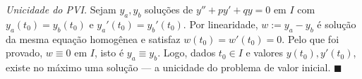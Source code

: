 \emph{Unicidade do PVI.} Sejam $y_a,y_b$ soluções de $y''+p y'+q y=0$ em $I$ com $y_a(t_0)=y_b(t_0)$ e $y_a'(t_0)=y_b'(t_0)$. Por linearidade, $w:=y_a-y_b$ é solução da mesma equação homogênea e satisfaz $w(t_0)=w'(t_0)=0$. Pelo que foi provado, $w\equiv0$ em $I$, isto é $y_a\equiv y_b$. Logo, dados $t_0\in I$ e valores $y(t_0),y'(t_0)$, existe no máximo uma solução --- a unicidade do problema de valor inicial. \qquad$\blacksquare$
